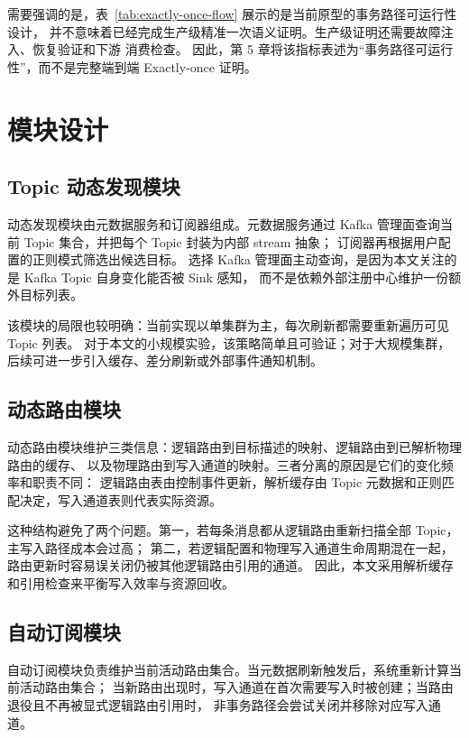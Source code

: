 需要强调的是，表~\ref{tab:exactly-once-flow} 展示的是当前原型的事务路径可运行性设计，
并不意味着已经完成生产级精准一次语义证明。生产级证明还需要故障注入、恢复验证和下游  消费检查。
因此，第 5 章将该指标表述为“事务路径可运行性”，而不是完整端到端 Exactly-once 证明。

\section{模块设计}

\subsection{Topic 动态发现模块}

动态发现模块由元数据服务和订阅器组成。元数据服务通过 Kafka 管理面查询当前 Topic 集合，并把每个 Topic 封装为内部 stream 抽象；
订阅器再根据用户配置的正则模式筛选出候选目标。
选择 Kafka 管理面主动查询，是因为本文关注的是 Kafka Topic 自身变化能否被 Sink 感知，
而不是依赖外部注册中心维护一份额外目标列表。

该模块的局限也较明确：当前实现以单集群为主，每次刷新都需要重新遍历可见 Topic 列表。
对于本文的小规模实验，该策略简单且可验证；对于大规模集群，后续可进一步引入缓存、差分刷新或外部事件通知机制。

\subsection{动态路由模块}

动态路由模块维护三类信息：逻辑路由到目标描述的映射、逻辑路由到已解析物理路由的缓存、
以及物理路由到写入通道的映射。三者分离的原因是它们的变化频率和职责不同：
逻辑路由表由控制事件更新，解析缓存由 Topic 元数据和正则匹配决定，写入通道表则代表实际资源。

这种结构避免了两个问题。第一，若每条消息都从逻辑路由重新扫描全部 Topic，主写入路径成本会过高；
第二，若逻辑配置和物理写入通道生命周期混在一起，路由更新时容易误关闭仍被其他逻辑路由引用的通道。
因此，本文采用解析缓存和引用检查来平衡写入效率与资源回收。

\subsection{自动订阅模块}

自动订阅模块负责维护当前活动路由集合。当元数据刷新触发后，系统重新计算当前活动路由集合；
当新路由出现时，写入通道在首次需要写入时被创建；当路由退役且不再被显式逻辑路由引用时，
非事务路径会尝试关闭并移除对应写入通道。

